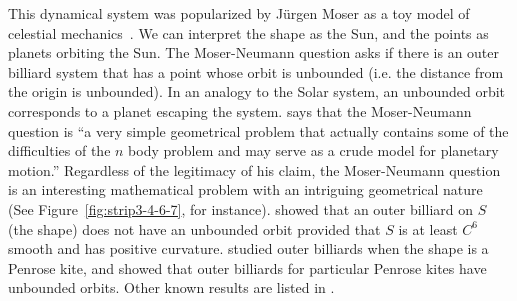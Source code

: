\documentclass[10pt,twoside,draft]{book}
\begin{document}
This dynamical system was popularized by Jürgen Moser as a toy model of celestial mechanics~\citep{moser,moserbook}.
We can interpret the shape as the Sun, and the points as planets orbiting the Sun.
The Moser-Neumann question asks if there is an outer billiard system that has a point whose orbit is unbounded (i.e. the distance from the origin is unbounded).
In an analogy to the Solar system, an unbounded orbit corresponds to a planet escaping the system.
\citet{moser} says that the Moser-Neumann question is
``a very simple geometrical problem that actually contains some of the difficulties of the $n$ body problem and may serve as a crude model for planetary motion.''
Regardless of the legitimacy of his claim, the Moser-Neumann question is an interesting mathematical problem with an intriguing geometrical nature (See Figure~\ref{fig:strip3-4-6-7}, for instance).
\citet{moserbook} showed that an outer billiard on $S$ (the shape) does not have an unbounded orbit provided that $S$ is at least $C^6$ smooth and has positive curvature. 
\citet{schwartz} studied outer billiards when the shape is a Penrose kite, and showed that outer billiards for particular Penrose kites have unbounded orbits.
Other known results are listed in \citet[p. 2]{schwartz}.
\end{document}
